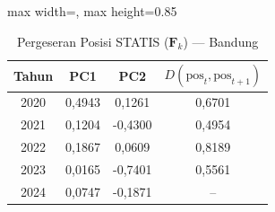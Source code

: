 \begin{table}[H]
\centering
\caption{Pergeseran Posisi STATIS ($\mathbf{F}_k$) --- Bandung} \label{tab:app2jarak_statis_skor_bandung}
\begin{adjustbox}{max width=\textwidth, max height=0.85\textheight}
\begin{tabular}{|c|c|c|c|}
\hline
\textbf{Tahun} & \textbf{PC1} & \textbf{PC2} & \textbf{$D(\text{pos}_t, \text{pos}_{t+1})$} \\
\hline
2020 & 0,4943 & 0,1261 & 0,6701 \\
2021 & 0,1204 & -0,4300 & 0,4954 \\
2022 & 0,1867 & 0,0609 & 0,8189 \\
2023 & 0,0165 & -0,7401 & 0,5561 \\
2024 & 0,0747 & -0,1871 & -- \\
\hline
\end{tabular}
\end{adjustbox}
\end{table}